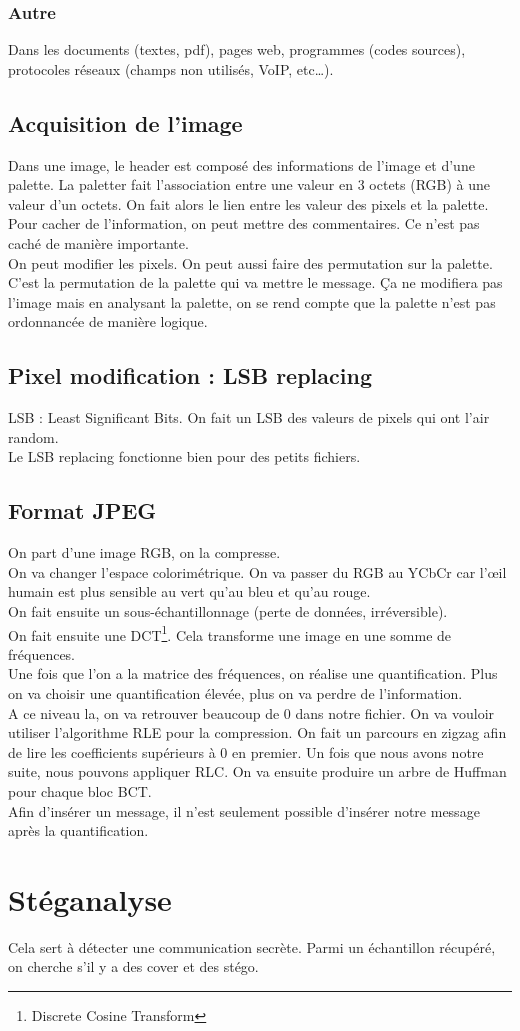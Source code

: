 \subsubsection{Autre}
Dans les documents (textes, pdf), pages web, programmes (codes sources), protocoles réseaux (champs non utilisés, VoIP, etc\ldots).
\subsection{Acquisition de l'image}
Dans une image, le header est composé des informations de l'image et d'une palette. La paletter fait l'association entre une valeur en 3 octets (RGB) à une valeur d'un octets. On fait alors le lien entre les valeur des pixels et la palette.\\
Pour cacher de l'information, on peut mettre des commentaires. Ce n'est pas caché de manière importante.\\
On peut modifier les pixels. On peut aussi faire des permutation sur la palette. C'est la permutation de la palette qui va mettre le message. Ça ne modifiera pas l'image mais en analysant la palette, on se rend compte que la palette n'est pas ordonnancée de manière logique.
\subsection{Pixel modification : LSB replacing}
LSB : Least Significant Bits. On fait un LSB des valeurs de pixels qui ont l'air random.\\
Le LSB replacing fonctionne bien pour des petits fichiers.
\subsection{Format JPEG}
On part d'une image RGB, on la compresse.\\
On va changer l'espace colorimétrique. On va passer du RGB au YCbCr car l'œil humain est plus sensible au vert qu'au bleu et qu'au rouge.\\
On fait ensuite un sous-échantillonnage (perte de données, irréversible).\\
On fait ensuite une DCT\footnote{Discrete Cosine Transform}. Cela transforme une image en une somme de fréquences.\\
Une fois que l'on a la matrice des fréquences, on réalise une quantification. Plus on va choisir une quantification élevée, plus on va perdre de l'information.\\
A ce niveau la, on va retrouver beaucoup de 0 dans notre fichier. On va vouloir utiliser l'algorithme RLE pour la compression. On fait un parcours en zigzag afin de lire les coefficients supérieurs à 0 en premier. Un fois que nous avons notre suite, nous pouvons appliquer RLC. On va ensuite produire un arbre de Huffman pour chaque bloc BCT.\\
Afin d'insérer un message, il n'est seulement possible d'insérer notre message après la quantification.
\section{Stéganalyse}
Cela sert à détecter une communication secrète. Parmi un échantillon récupéré, on cherche s'il y a des cover et des stégo.